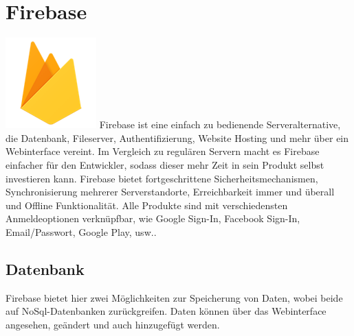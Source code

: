 \section{Firebase}
\includegraphics{images/firebaseLogo.png}
\newline
Firebase ist eine einfach zu bedienende Serveralternative, die Datenbank, Fileserver, Authentifizierung, Website Hosting und mehr über ein Webinterface vereint. Im Vergleich zu regulären Servern macht es Firebase einfacher für den Entwickler, sodass dieser mehr Zeit in sein Produkt selbst investieren kann. 
Firebase bietet fortgeschrittene Sicherheitsmechanismen, Synchronisierung mehrerer Serverstandorte, Erreichbarkeit immer und überall und Offline Funktionalität.
Alle Produkte sind mit verschiedensten Anmeldeoptionen verknüpfbar, wie Google Sign-In,
Facebook Sign-In, Email/Passwort, Google Play, usw..
\subsection{Datenbank}
Firebase bietet hier zwei Möglichkeiten zur Speicherung von Daten, wobei beide auf NoSql-Datenbanken zurückgreifen. Daten können über das Webinterface angesehen, geändert und auch hinzugefügt werden.
